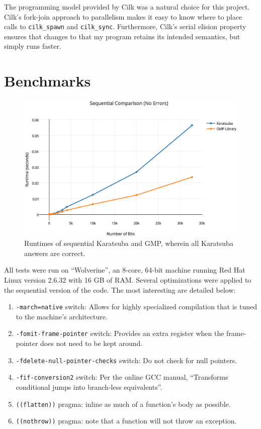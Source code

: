 \documentclass[8pt, twocolumn]{article}
\begin{document}
The programming model provided by Cilk was a natural choice for this project.
Cilk's fork-join approach to parallelism makes it easy to know where to place
calls to \texttt{cilk\_spawn} and \texttt{cilk\_sync}. Furthermore, Cilk's
serial elision property ensures that changes to that my program retains its
intended semantics, but simply runs faster.

\section{Benchmarks}

\begin{figure}[t]
    \includegraphics[scale=0.4]{sequential-error-free}
    \caption{Runtimes of sequential Karatsuba and GMP, wherein all Karatsuba answers
    are correct.}
    \label{fig:sequential-correct}
\end{figure}

All tests were run on ``Wolverine'', an 8-core, 64-bit machine running Red Hat
Linux version 2.6.32 with 16 GB of RAM.  Several optimizations were applied to
the sequential version of the code.  The most interesting are detailed below:
\begin{enumerate}
    \item \texttt{-march=native} switch: Allows for highly specialized compilation
          that is tuned to the machine's architecture.
    \item \texttt{-fomit-frame-pointer} switch: Provides an extra register when the
           frame-pointer does not need to be kept around.
    \item \texttt{-fdelete-null-pointer-checks} switch:  Do not check for null
          pointers.
    \item \texttt{-fif-conversion2} switch: Per the online GCC manual, ``Transforms
          conditional jumps into branch-less equivalents''.
    \item \texttt{((flatten))} pragma: inline as much of a function's body as
          possible.
    \item \texttt{((nothrow))} pragma: note that a function will not throw an
          exception.
\end{enumerate}
\end{document}
